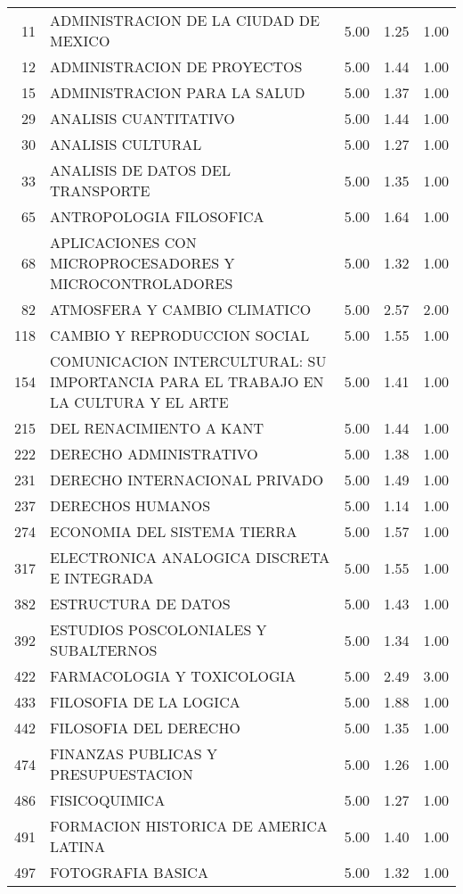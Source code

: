 \documentclass[12pt]{article}
\begin{document}
\begin{table}[ht]
\begin{tabular}{rlrrr}
  11 & ADMINISTRACION DE LA CIUDAD DE MEXICO & 5.00 & 1.25 & 1.00 \\ 
  12 & ADMINISTRACION DE PROYECTOS & 5.00 & 1.44 & 1.00 \\ 
  15 & ADMINISTRACION PARA LA SALUD & 5.00 & 1.37 & 1.00 \\ 
  29 & ANALISIS CUANTITATIVO & 5.00 & 1.44 & 1.00 \\ 
  30 & ANALISIS CULTURAL & 5.00 & 1.27 & 1.00 \\ 
  33 & ANALISIS DE DATOS DEL TRANSPORTE & 5.00 & 1.35 & 1.00 \\ 
  65 & ANTROPOLOGIA FILOSOFICA & 5.00 & 1.64 & 1.00 \\ 
  68 & APLICACIONES CON MICROPROCESADORES Y MICROCONTROLADORES & 5.00 & 1.32 & 1.00 \\ 
  82 & ATMOSFERA Y CAMBIO CLIMATICO & 5.00 & 2.57 & 2.00 \\ 
  118 & CAMBIO Y REPRODUCCION SOCIAL & 5.00 & 1.55 & 1.00 \\ 
  154 & COMUNICACION INTERCULTURAL: SU IMPORTANCIA PARA EL TRABAJO EN LA CULTURA Y EL ARTE & 5.00 & 1.41 & 1.00 \\ 
  215 & DEL RENACIMIENTO A KANT & 5.00 & 1.44 & 1.00 \\ 
  222 & DERECHO ADMINISTRATIVO & 5.00 & 1.38 & 1.00 \\ 
  231 & DERECHO INTERNACIONAL PRIVADO & 5.00 & 1.49 & 1.00 \\ 
  237 & DERECHOS HUMANOS & 5.00 & 1.14 & 1.00 \\ 
  274 & ECONOMIA DEL SISTEMA TIERRA & 5.00 & 1.57 & 1.00 \\ 
  317 & ELECTRONICA ANALOGICA DISCRETA E INTEGRADA & 5.00 & 1.55 & 1.00 \\ 
  382 & ESTRUCTURA DE DATOS & 5.00 & 1.43 & 1.00 \\ 
  392 & ESTUDIOS POSCOLONIALES Y SUBALTERNOS & 5.00 & 1.34 & 1.00 \\ 
  422 & FARMACOLOGIA Y TOXICOLOGIA & 5.00 & 2.49 & 3.00 \\ 
  433 & FILOSOFIA DE LA LOGICA & 5.00 & 1.88 & 1.00 \\ 
  442 & FILOSOFIA DEL DERECHO & 5.00 & 1.35 & 1.00 \\ 
  474 & FINANZAS PUBLICAS Y PRESUPUESTACION & 5.00 & 1.26 & 1.00 \\ 
  486 & FISICOQUIMICA & 5.00 & 1.27 & 1.00 \\ 
  491 & FORMACION HISTORICA DE AMERICA LATINA & 5.00 & 1.40 & 1.00 \\ 
  497 & FOTOGRAFIA BASICA & 5.00 & 1.32 & 1.00 \\ 

\end{tabular}
\end{table}
\end{document}
